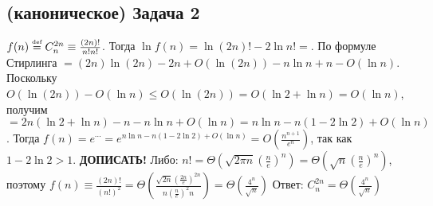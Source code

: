 \documentclass[a4paper]{article}
\def\eqdef{\overset{\mbox{\tiny def}}{=}}
\begin{document}
\subsection*{(каноническое) Задача 2}
$f(n)\eqdef C^{2n}_n\equiv\frac{(2n)!}{n!n!}$. Тогда $\ln f(n)=\ln(2n)!-2\ln n!\boxed{=}$. По формуле Стирлинга $\boxed{=}(2n)\ln(2n)-2n+O(\ln(2n))-n\ln n+n-O(\ln n)$. Поскольку $O(\ln(2n))-O(\ln n)\leqslant O(\ln(2n))=O(\ln 2+\ln n)=O(\ln n)$, получим $\boxed{=}2n(\ln 2+\ln n)-n-n\ln n+O(\ln n)=n\ln n-n(1-2\ln 2)+O(\ln n)$. Тогда $f(n)=e^{\cdots}=e^{n\ln n-n(1-2\ln 2)+O(\ln n)}=O(\frac{n^{n+1}}{e^{n}})$, так как $1-2\ln 2>1$.
{\bf ДОПИСАТЬ!}
Либо: $n!=\Theta(\sqrt{2\pi n}(\frac{n}{e})^n)=\Theta(\sqrt{n}(\frac{n}{e})^n)$, поэтому $f(n)\equiv\frac{(2n)!}{(n!)^2}=\Theta(\frac{\sqrt{2n}(\frac{2n}{e})^{2n}}{n(\frac{n}{e})^2n})=\Theta(\frac{4^n}{\sqrt{n}})$\newline
Ответ: $\boxed{C^{2n}_n=\Theta(\frac{4^n}{\sqrt{n}})}$
\end{document}
